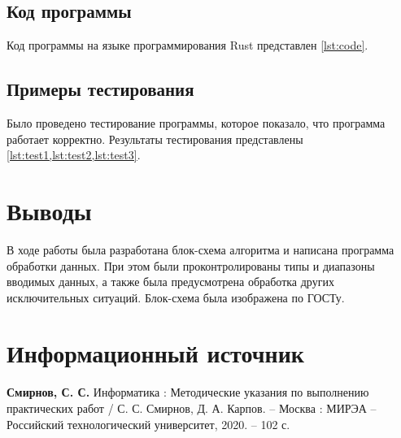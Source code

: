 \documentclass[14pt, a4paper]{extreport}
\begin{document}
\section{Код программы}
Код программы на языке программирования Rust представлен \cref{lst:code}.



\section{Примеры тестирования}
Было проведено тестирование программы, которое показало, что программа работает корректно. Результаты тестирования представлены \cref{lst:test1,lst:test2,lst:test3}.




\chapter{Выводы}
В ходе работы была разработана блок-схема алгоритма и написана программа обработки данных. При этом были проконтролированы типы и диапазоны вводимых данных, а также была предусмотрена обработка других исключительных ситуаций. Блок-схема была изображена по ГОСТу.

\chapter{Информационный источник}
\textbf{Смирнов, С. С.} Информатика : Методические указания по выполнению практических работ / С. С. Смирнов, Д. А. Карпов. -- Москва : МИРЭА -- Российский технологический университет, 2020. -- 102 с.
\end{document}
